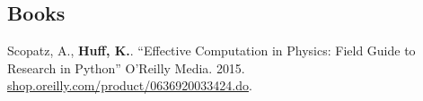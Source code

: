 \documentclass[margin,line]{resume}
\begin{document}
\begin{resume}
    \vspace{-6mm}
    \section{\mysidestyle Books}
      \begin{bibenum}
      \item Scopatz, A., \textbf{Huff, K.}. ``Effective Computation in
      Physics: Field Guide to Research in Python'' O'Reilly Media. 2015.
      \url{shop.oreilly.com/product/0636920033424.do}.
      \end{bibenum}

\end{resume}
\end{document}

